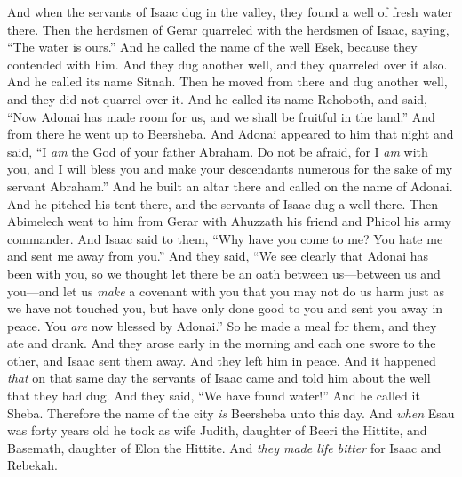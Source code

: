 \begin{biblechapter}
\verse And when the servants of Isaac dug in the valley, they found a well of fresh water there.
\verse Then the herdsmen of Gerar quarreled with the herdsmen of Isaac, saying, “The water is ours.” And he called the name of the well Esek, because they contended with him.
\verse And they dug another well, and they quarreled over it also. And he called its name Sitnah.
\verse Then he moved from there and dug another well, and they did not quarrel over it. And he called its name Rehoboth, and said, “Now Adonai has made room for us, and we shall be fruitful in the land.”
\verse And from there he went up to Beersheba.
\verse And Adonai appeared to him that night and said, “I \textit{am} the God of your father Abraham. Do not be afraid, for I \textit{am} with you, and I will bless you and make your descendants numerous for the sake of my servant Abraham.”
\verse And he built an altar there and called on the name of Adonai. And he pitched his tent there, and the servants of Isaac dug a well there.
\verse Then Abimelech went to him from Gerar with Ahuzzath his friend and Phicol his army commander.
\verse And Isaac said to them, “Why have you come to me? You hate me and sent me away from you.”
\verse And they said, “We see clearly that Adonai has been with you, so we thought let there be an oath between us—between us and you—and let us \textit{make} a covenant with you
\verse that you may not do us harm just as we have not touched you, but have only done good to you and sent you away in peace. You \textit{are} now blessed by Adonai.”
\verse So he made a meal for them, and they ate and drank.
\verse And they arose early in the morning and each one swore to the other, and Isaac sent them away. And they left him in peace.
\verse And it happened \textit{that} on that same day the servants of Isaac came and told him about the well that they had dug. And they said, “We have found water!”
\verse And he called it Sheba. Therefore the name of the city \textit{is} Beersheba unto this day.
\verse And \textit{when} Esau was forty years old he took as wife Judith, daughter of Beeri the Hittite, and Basemath, daughter of Elon the Hittite.
\verse And \textit{they made life bitter} for Isaac and Rebekah.
\end{biblechapter}

